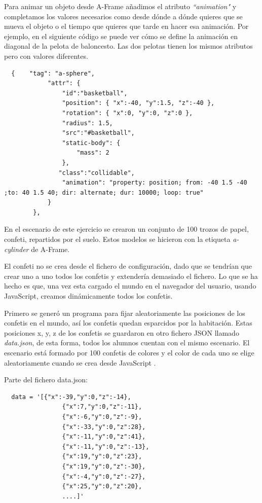 Para animar un objeto desde A-Frame añadimos el atributo \textit{``animation"} y completamos los valores necesarios como desde dónde a dónde quieres que se mueva  el objeto o el tiempo que quieres que tarde en hacer esa animación. Por ejemplo, en el siguiente código se puede ver cómo se define la animación en diagonal de la pelota de baloncesto. Las dos pelotas tienen los mismos atributos pero con valores diferentes.
\begin{lstlisting}
  {    "tag": "a-sphere",
            "attr": {
                "id":"basketball",
                "position": { "x":-40, "y":1.5, "z":-40 },
                "rotation": { "x":0, "y":0, "z":0 },
                "radius": 1.5,
                "src":"#basketball",
                "static-body": {
                    "mass": 2
                },              
	           "class":"collidable",
                "animation": "property: position; from: -40 1.5 -40 ;to: 40 1.5 40; dir: alternate; dur: 10000; loop: true"
            }
        },
\end{lstlisting}

En el escenario de este ejercicio se crearon un conjunto de 100 trozos de papel, confeti, repartidos por el suelo. Estos modelos se hicieron con la etiqueta \textit{a-cylinder} de A-Frame.  

El confeti no se crea desde el fichero de configuración, dado que se tendrían que crear uno a uno todos los confetis y extendería demasiado el fichero. Lo que se ha hecho es que, una vez esta cargado el mundo en el navegador del usuario, usando JavaScript, creamos dinámicamente todos los confetis.

Primero se generó un programa para fijar aleatoriamente las posiciones de los confetis en el mundo, así los confetis quedan esparcidos por la habitación. Estas posiciones x, y, z de los confetis se guardaron en otro fichero JSON llamado \textit{data.json}, de esta forma, todos los alumnos cuentan con el mismo escenario. El escenario está formado por 100 confetis de colores y el color de cada uno se elige aleatoriamente cuando se crea desde JavaScript .

Parte del fichero data.json: 
\begin{lstlisting}
  data = '[{"x":-39,"y":0,"z":-14},
                {"x":7,"y":0,"z":-11},
                {"x":-6,"y":0,"z":-9},
                {"x":-33,"y":0,"z":28},
                {"x":-11,"y":0,"z":41},
                {"x":-11,"y":0,"z":-13},
                {"x":19,"y":0,"z":23},
                {"x":19,"y":0,"z":-30},
                {"x":-4,"y":0,"z":-27},
                {"x":25,"y":0,"z":20},
                ....]'
 \end{lstlisting}


